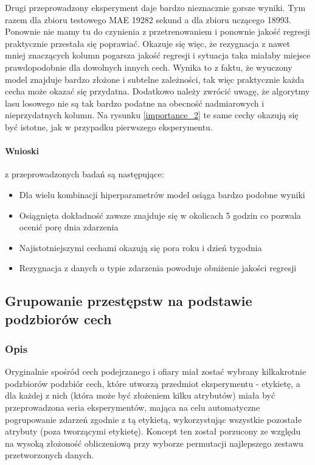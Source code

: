 \documentclass{classrep}
\begin{document}
{{{                Drugi przeprowadzony eksperyment daje bardzo nieznacznie gorsze wyniki. Tym razem dla zbioru testowego MAE 19282 sekund a dla zbioru uczącego 18993. Ponownie nie mamy tu do czynienia z przetrenowaniem i ponownie jakość regresji praktycznie przestała się poprawiać. Okazuje się więc, że rezygnacja z nawet mniej znaczących kolumn pogarsza jakość regresji i sytuacja taka miałaby miejsce prawdopodobnie dla dowolnych innych cech. Wynika to z faktu, że wyuczony model znajduje bardzo złożone i subtelne zależności, tak więc praktycznie każda cecha może okazać się przydatna. Dodatkowo należy zwrócić uwagę, że algorytmy lasu losowego nie są tak bardzo podatne na obecność nadmiarowych i nieprzydatnych kolumn. Na rysunku \ref{importance_2} te same cechy okazują się być istotne, jak w przypadku pierwszego eksperymentu.
                
                \paragraph{Wnioski} z przeprowadzonych badań są następujące:
                \begin{itemize}
                    \item Dla wielu kombinacji hiperparametrów model osiąga bardzo podobne wyniki
                    \item Osiągnięta dokładność zawsze znajduje się w okolicach 5 godzin co pozwala ocenić porę dnia zdarzenia
                    \item Najistotniejszymi cechami okazują się pora roku i dzień tygodnia
                    \item Rezygnacja z danych o typie zdarzenia powoduje obniżenie jakości regresji
                \end{itemize}
            }
        }
        \newpage

        \subsection{Grupowanie przestępstw na podstawie podzbiorów cech}
        \label{project_goal_3} {
            \subsubsection{Opis} {
                Oryginalnie spośród cech podejrzanego i ofiary miał zostać wybrany kilkakrotnie  podzbiorów podzbiór cech, które utworzą
                przedmiot eksperymentu - etykietę, a dla każdej z 
                nich (która może być złożeniem kilku atrybutów) miała być przeprowadzona
                seria eksperymentów, mająca na celu automatyczne pogrupowanie zdarzeń
                zgodnie z tą etykietą, wykorzystując wszystkie pozostałe atrybuty (poza
                tworzącymi etykietę). Koncept ten został porzucony ze względu na wysoką złożoność obliczeniową przy wyborze permutacji najlepszego zestawu przetworzonych danych.
                
}}}
\end{document}
